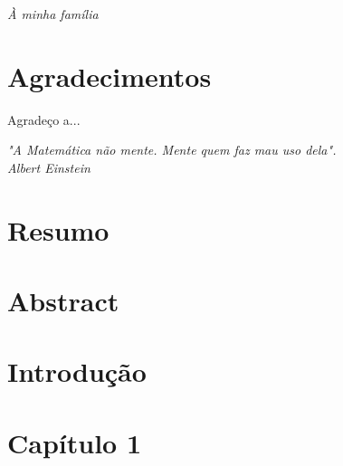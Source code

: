 \documentclass[12pt, a4paper]{report}
\begin{document}
\newpage
\vspace*{21cm}
\begin{flushright}
\textit{À minha família}
\end{flushright}


\newpage
\chapter*{Agradecimentos}
\thispagestyle{empty}

Agradeço a...

\newpage
\vspace*{20cm}
\begin{flushright}
\begin{minipage}{7cm}
\begin{flushright}
\textit{
"A Matemática não mente. Mente quem faz mau uso dela". \\
Albert Einstein}
\end{flushright}
\end{minipage}
\end{flushright}


\newpage
\chapter*{Resumo}
\thispagestyle{empty}



\newpage
\chapter*{Abstract}
\thispagestyle{empty}


\newpage
\tableofcontents
\thispagestyle{empty}


\chapter*{Introdução}
\pagestyle{myheadings}
\setcounter{page}{1}



\chapter{Capítulo 1}
	
\end{document}
